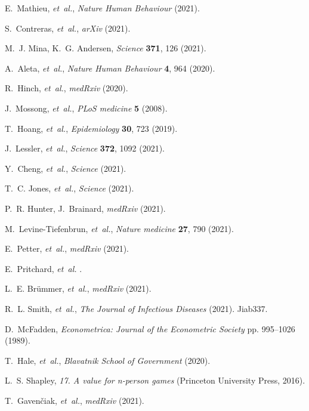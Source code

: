 \documentclass[12pt]{article}
\begin{document}
\begin{thebibliography}{10}

E.~Mathieu, {\it et~al.\/}, {\it Nature Human Behaviour\/}  (2021).

S.~Contreras, {\it et~al.\/}, {\it arXiv\/}  (2021).

M.~J. Mina, K.~G. Andersen, {\it Science\/} {\bf 371}, 126 (2021).

A.~Aleta, {\it et~al.\/}, {\it Nature Human Behaviour\/} {\bf 4}, 964 (2020).

R.~Hinch, {\it et~al.\/}, {\it medRxiv\/}  (2020).

J.~Mossong, {\it et~al.\/}, {\it PLoS medicine\/} {\bf 5} (2008).

T.~Hoang, {\it et~al.\/}, {\it Epidemiology\/} {\bf 30}, 723 (2019).

J.~Lessler, {\it et~al.\/}, {\it Science\/} {\bf 372}, 1092 (2021).

Y.~Cheng, {\it et~al.\/}, {\it Science\/}  (2021).

T.~C. Jones, {\it et~al.\/}, {\it Science\/}  (2021).

P.~R. Hunter, J.~Brainard, {\it medRxiv\/}  (2021).

M.~Levine-Tiefenbrun, {\it et~al.\/}, {\it Nature medicine\/} {\bf 27}, 790
  (2021).

E.~Petter, {\it et~al.\/}, {\it medRxiv\/}  (2021).

E.~Pritchard, {\it et~al.\/} .

L.~E. Br\"{u}mmer, {\it et~al.\/}, {\it medRxiv\/}  (2021).

R.~L. Smith, {\it et~al.\/}, {\it The Journal of Infectious Diseases\/}
  (2021). Jiab337.

D.~McFadden, {\it Econometrica: Journal of the Econometric Society\/} pp.
  995--1026 (1989).

T.~Hale, {\it et~al.\/}, {\it Blavatnik School of Government\/}  (2020).

L.~S. Shapley, {\it 17. A value for n-person games\/} (Princeton University
  Press, 2016).

T.~Gaven{\v c}iak, {\it et~al.\/}, {\it medRxiv\/}  (2021).


\end{thebibliography}
\end{document}
